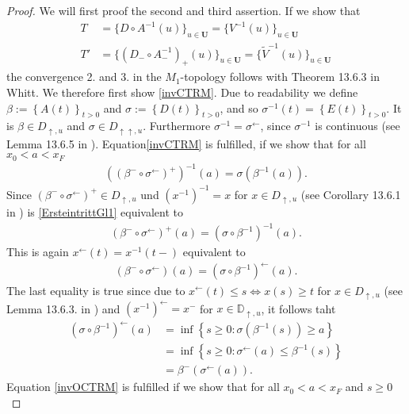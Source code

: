 \documentclass[12pt, a4paper]{article}
\newcommand{\1}{\mathbf 1}
\begin{document}
\begin{proof}
We will first proof the second and third assertion. If we show that 
  \begin{align}
  T&=\{D \circ A^{-1}(u)\}_{u \in \mathbf U}=\{V^{-1}(u)\}_{u \in \mathbf U} \label{invCTRM}\\
  T'&= \{(D_- \circ A^{-1}_-)_+(u)\}_{u \in \mathbf U}=\{\tilde V^{-1}(u)\}_{u \in \mathbf U} \label{invOCTRM}
  \end{align}  
the convergence 2. and 3. in the $M_1$-topology follows with Theorem 13.6.3 in Whitt. We therefore first show \eqref{invCTRM}. 
Due to readability we define $\beta:=\left\{A(t)\right\}_{t>0}$ and $\sigma:=\left\{D(t)\right\}_{t>0}$, and so $\sigma^{-1}(t)=\left\{E(t)\right\}_{t>0}$. It is $\beta \in D_{\uparrow,u}$ and $\sigma \in D_{\uparrow \uparrow,u}$. Furthermore $\sigma^{-1}=\sigma^{\leftarrow}$, since $\sigma^{-1}$ is continuous (see Lemma 13.6.5 in \cite{Whitt2010}). Equation\eqref{invCTRM} is fulfilled, if we show that for all $x_0<a<x_F$
\begin{align}
((\beta^{-} \circ \sigma^{\leftarrow})^{+})^{-1}(a)=\sigma(\beta^{-1}(a)).\label{ErsteintrittGl1}
\end{align}
Since $(\beta^{-} \circ \sigma^{\leftarrow})^{+} \in D_{\uparrow,u}$ und $(x^{-1})^{-1}=x$ for $x \in D_{\uparrow,u}$ (see Corollary 13.6.1 in \cite{Whitt2010}) is \eqref{ErsteintrittGl1} equivalent to
\begin{align*}
(\beta^{-} \circ \sigma^{\leftarrow})^{+}(a)=(\sigma \circ \beta^{-1})^{-1}(a).
\end{align*}
This is again $x^{\leftarrow}(t)=x^{-1}(t-)$ equivalent to
\begin{align*}
(\beta^{-} \circ \sigma^{\leftarrow})(a)=(\sigma \circ \beta^{-1})^{\leftarrow}(a).
\end{align*}
The last equality is true since due to $x^{\leftarrow}(t) \leq s \Leftrightarrow x(s) \geq t$ for $x \in D_{\uparrow,u}$  (see Lemma 13.6.3. in \cite{Whitt2010}) and $(x^{-1})^{\leftarrow}=x^{-}$ for $x \in \mathbb{D}_{\uparrow,u}$, it follows taht
\begin{align*}
(\sigma \circ \beta^{-1})^{\leftarrow}(a)&=\inf \left\{s \geq 0: \sigma(\beta^{-1}(s)) \geq a \right\}\\
&=\inf \left\{s \geq 0: \sigma^{\leftarrow}(a) \leq \beta^{-1}(s)\right\}\\
&=\beta^{-}(\sigma^{\leftarrow}(a)).
\end{align*}
Equation \eqref{invOCTRM} is fulfilled if we show that for all $x_0<a<x_F$ and $s\geq  0$

\end{proof}
\end{document}
